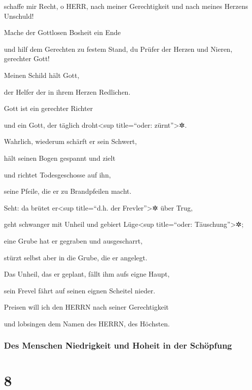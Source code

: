 schaffe mir Recht, o HERR, nach meiner Gerechtigkeit und nach meines
Herzens Unschuld!

Mache der Gottlosen Bosheit ein Ende

und hilf dem Gerechten zu festem Stand, du Prüfer der Herzen und Nieren,
gerechter Gott!

Meinen Schild hält Gott,

der Helfer der in ihrem Herzen Redlichen.

Gott ist ein gerechter Richter

und ein Gott, der täglich droht\textless sup title=``oder:
zürnt''\textgreater✲.

Wahrlich, wiederum schärft er sein Schwert,

hält seinen Bogen gespannt und zielt

und richtet Todesgeschosse auf ihn,

seine Pfeile, die er zu Brandpfeilen macht.

Seht: da brütet er\textless sup title=``d.h. der
Frevler''\textgreater✲ über Trug,

geht schwanger mit Unheil und gebiert Lüge\textless sup title=``oder:
Täuschung''\textgreater✲;

eine Grube hat er gegraben und ausgescharrt,

stürzt selbst aber in die Grube, die er angelegt.

Das Unheil, das er geplant, fällt ihm aufs eigne Haupt,

sein Frevel fährt auf seinen eignen Scheitel nieder.

Preisen will ich den HERRN nach seiner Gerechtigkeit

und lobsingen dem Namen des HERRN, des Höchsten.

\hypertarget{des-menschen-niedrigkeit-und-hoheit-in-der-schuxf6pfung}{%
\subsubsection{Des Menschen Niedrigkeit und Hoheit in der
Schöpfung}\label{des-menschen-niedrigkeit-und-hoheit-in-der-schuxf6pfung}}

\hypertarget{section-7}{%
\section{8}\label{section-7}}

